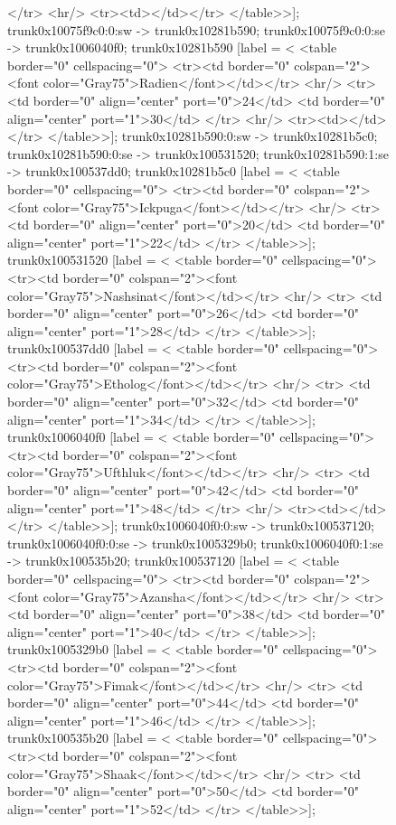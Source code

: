 \documentclass[12pt]{article}
\begin{document}
\begin{figure}
{{	</tr>
	<hr/>
	<tr><td></td></tr>
</table>>];
	trunk0x10075f9c0:0:sw -> trunk0x10281b590;
	trunk0x10075f9c0:0:se -> trunk0x1006040f0;
	trunk0x10281b590 [label = <
<table border="0" cellspacing="0">
	<tr><td border="0" colspan="2"><font color="Gray75">Radien</font></td></tr>
	<hr/>
	<tr>
	<td border="0" align="center" port="0">24</td>
	<td border="0" align="center" port="1">30</td>
	</tr>
	<hr/>
	<tr><td></td></tr>
</table>>];
	trunk0x10281b590:0:sw -> trunk0x10281b5c0;
	trunk0x10281b590:0:se -> trunk0x100531520;
	trunk0x10281b590:1:se -> trunk0x100537dd0;
	trunk0x10281b5c0 [label = <
<table border="0" cellspacing="0">
	<tr><td border="0" colspan="2"><font color="Gray75">Ickpuga</font></td></tr>
	<hr/>
	<tr>
	<td border="0" align="center" port="0">20</td>
	<td border="0" align="center" port="1">22</td>
	</tr>
</table>>];
	trunk0x100531520 [label = <
<table border="0" cellspacing="0">
	<tr><td border="0" colspan="2"><font color="Gray75">Nashsinat</font></td></tr>
	<hr/>
	<tr>
	<td border="0" align="center" port="0">26</td>
	<td border="0" align="center" port="1">28</td>
	</tr>
</table>>];
	trunk0x100537dd0 [label = <
<table border="0" cellspacing="0">
	<tr><td border="0" colspan="2"><font color="Gray75">Etholog</font></td></tr>
	<hr/>
	<tr>
	<td border="0" align="center" port="0">32</td>
	<td border="0" align="center" port="1">34</td>
	</tr>
</table>>];
	trunk0x1006040f0 [label = <
<table border="0" cellspacing="0">
	<tr><td border="0" colspan="2"><font color="Gray75">Ufthluk</font></td></tr>
	<hr/>
	<tr>
	<td border="0" align="center" port="0">42</td>
	<td border="0" align="center" port="1">48</td>
	</tr>
	<hr/>
	<tr><td></td></tr>
</table>>];
	trunk0x1006040f0:0:sw -> trunk0x100537120;
	trunk0x1006040f0:0:se -> trunk0x1005329b0;
	trunk0x1006040f0:1:se -> trunk0x100535b20;
	trunk0x100537120 [label = <
<table border="0" cellspacing="0">
	<tr><td border="0" colspan="2"><font color="Gray75">Azansha</font></td></tr>
	<hr/>
	<tr>
	<td border="0" align="center" port="0">38</td>
	<td border="0" align="center" port="1">40</td>
	</tr>
</table>>];
	trunk0x1005329b0 [label = <
<table border="0" cellspacing="0">
	<tr><td border="0" colspan="2"><font color="Gray75">Fimak</font></td></tr>
	<hr/>
	<tr>
	<td border="0" align="center" port="0">44</td>
	<td border="0" align="center" port="1">46</td>
	</tr>
</table>>];
	trunk0x100535b20 [label = <
<table border="0" cellspacing="0">
	<tr><td border="0" colspan="2"><font color="Gray75">Shaak</font></td></tr>
	<hr/>
	<tr>
	<td border="0" align="center" port="0">50</td>
	<td border="0" align="center" port="1">52</td>
	</tr>
</table>>];
}}
\end{figure}
\end{document}
